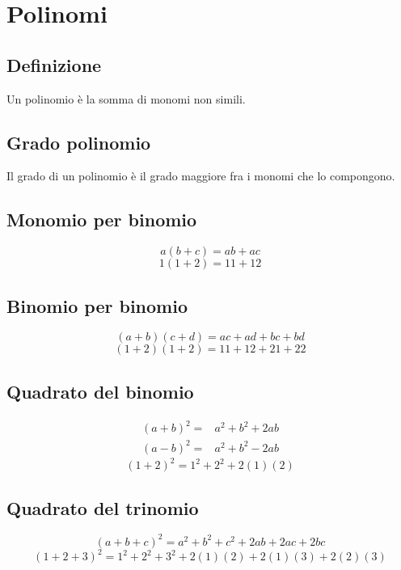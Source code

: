 \chapter{Polinomi}
\section{Definizione}
Un polinomio è la somma di monomi non simili.
\section{Grado polinomio}
Il grado di un polinomio è il grado maggiore fra i 
monomi che lo compongono.
\section{Monomio per binomio}
\begin{equation*}
a(b+c)=ab+ac
\end{equation*}
\begin{equation*}
1(1+2)=11+12
\end{equation*}
\section{Binomio per binomio}
\begin{equation*}
(a+b)(c+d)=ac+ad+bc+bd
\end{equation*}
\begin{equation*}
(1+2)(1+2)=11+12+21+22
\end{equation*}
\section{Quadrato del binomio}
\begin{align*}
(a+b)^2=&a^2+b^2+2ab\\
(a-b)^2=&a^2+b^2-2ab
\end{align*}
\begin{equation*}
(1+2)^2=1^2+2^2+2(1)(2)
\end{equation*}
\section{Quadrato del trinomio}
\begin{equation*}
(a+b+c)^2=a^2+b^2+c^2+2ab+2ac+2bc
\end{equation*}
\begin{equation*}
(1+2+3)^2=1^2+2^2+3^2+2(1)(2)+2(1)(3)+2(2)(3)
\end{equation*}

